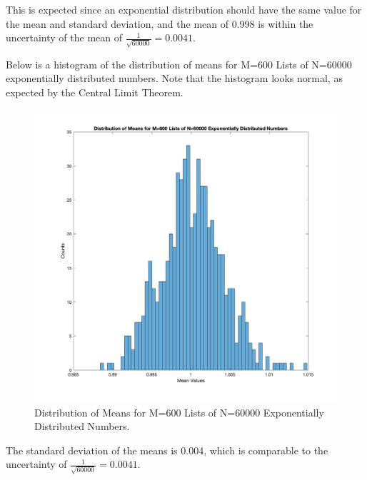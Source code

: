 \documentclass{article}
\begin{document}
    This is expected since an exponential distribution should have the same value for the mean and standard deviation, and the mean of 0.998 is within the uncertainty of the mean of $\frac{1}{\sqrt{60000}}=0.0041$.
   
   Below is a histogram of the distribution of means for M=600 Lists of N=60000 exponentially distributed numbers. Note that the histogram looks normal, as expected by the Central Limit Theorem.
   
    \begin{figure}[H]
  \centering
  \includegraphics[width=0.8\linewidth]{lateximages/Prob4_4_60000.png}
  \caption{Distribution of Means for M=600 Lists of N=60000 Exponentially Distributed Numbers.}
  \label{fig:boat1}
  \end{figure}
  
  The standard deviation of the means is 0.004, which is comparable to the uncertainty of $\frac{1}{\sqrt{60000}}=0.0041$. 
\end{document}
